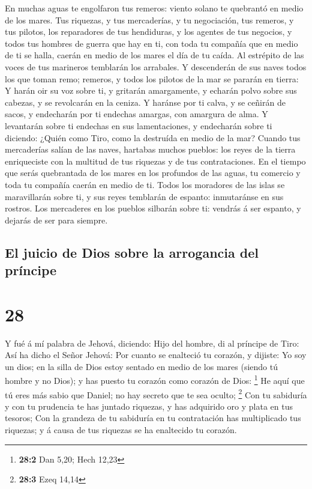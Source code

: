  En muchas aguas te engolfaron tus remeros: viento solano
te quebrantó en medio de los mares.  Tus riquezas, y tus
mercaderías, y tu negociación, tus remeros, y tus pilotos, los
reparadores de tus hendiduras, y los agentes de tus negocios, y todos
tus hombres de guerra que hay en ti, con toda tu compañía que en medio
de ti se halla, caerán en medio de los mares el día de tu caída.
 Al estrépito de las voces de tus marineros temblarán los
arrabales.  Y descenderán de sus naves todos los que toman
remo; remeros, y todos los pilotos de la mar se pararán en tierra:
 Y harán oir su voz sobre ti, y gritarán amargamente, y
echarán polvo sobre sus cabezas, y se revolcarán en la ceniza.
 Y haránse por ti calva, y se ceñirán de sacos, y
endecharán por ti endechas amargas, con amargura de alma. 
Y levantarán sobre ti endechas en sus lamentaciones, y endecharán sobre
ti diciendo: ¿Quién como Tiro, como la destruída en medio de la mar?
 Cuando tus mercaderías salían de las naves, hartabas
muchos pueblos: los reyes de la tierra enriqueciste con la multitud de
tus riquezas y de tus contrataciones.  En el tiempo que
serás quebrantada de los mares en los profundos de las aguas, tu
comercio y toda tu compañía caerán en medio de ti.  Todos
los moradores de las islas se maravillarán sobre ti, y sus reyes
temblarán de espanto: inmutaránse en sus rostros.  Los
mercaderes en los pueblos silbarán sobre ti: vendrás á ser espanto, y
dejarás de ser para siempre.

\hypertarget{el-juicio-de-dios-sobre-la-arrogancia-del-pruxedncipe}{%
\subsection{El juicio de Dios sobre la arrogancia del
príncipe}\label{el-juicio-de-dios-sobre-la-arrogancia-del-pruxedncipe}}

\hypertarget{section-27}{%
\section{28}\label{section-27}}

 Y fué á mí palabra de Jehová, diciendo:  Hijo
del hombre, di al príncipe de Tiro: Así ha dicho el Señor Jehová: Por
cuanto se enalteció tu corazón, y dijiste: Yo soy un dios; en la silla
de Dios estoy sentado en medio de los mares (siendo tú hombre y no
Dios); y has puesto tu corazón como corazón de Dios: \footnote{\textbf{28:2}
  Dan 5,20; Hech 12,23}  He aquí que tú eres más sabio que
Daniel; no hay secreto que te sea oculto; \footnote{\textbf{28:3} Ezeq
  14,14}  Con tu sabiduría y con tu prudencia te has juntado
riquezas, y has adquirido oro y plata en tus tesoros;  Con
la grandeza de tu sabiduría en tu contratación has multiplicado tus
riquezas; y á causa de tus riquezas se ha enaltecido tu corazón.

